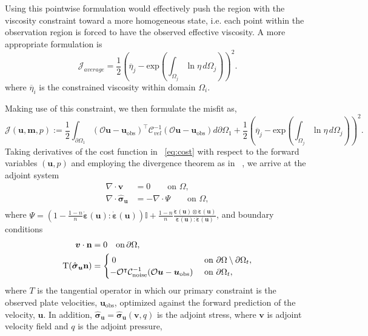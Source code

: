 \documentclass[12pt]{article}
\newcommand{\mm}{{\ensuremath{\boldsymbol{m}}}}
\newcommand{\uu}{{\ensuremath{\boldsymbol{u}}}}
\newcommand{\vv}{{\ensuremath{\boldsymbol{v}}}}
\newcommand{\ssigma}{{\ensuremath{\boldsymbol{\sigma}}}}
\newcommand{\strain}{{\ensuremath{\dot{\boldsymbol{\varepsilon}}}}}
\begin{document}
{Using this pointwise formulation would effectively push the region with the viscosity constraint toward a more homogeneous state, i.e. each point within the observation region is forced to have the observed effective viscosity. A more appropriate formulation is
\begin{equation}
 \mathcal{J}_{average}=\frac{1}{2}(\overline{\eta}_j - \text{exp}({\int_{\Omega_j} \ln \eta \,d\Omega_j}))^{2}.
\end{equation}
where $\overline{\eta}_i$ is the constrained viscosity within domain $\Omega_i$.

Making use of this constraint, we then formulate the misfit as,
\begin{equation}
  \mathcal{J}(\uu,\mm,p):= \frac{1}{2}\int_{\partial \Omega_1} (\mathcal{O}\uu-\uu_{\text{obs}})^\intercal\mathcal{C}^{-1}_{vel}(\mathcal{O}\uu-\uu_{\text{obs}})d\partial\Omega_1 
   +\frac{1}{2}(\overline{\eta}_j - \text{exp}({\int_{\Omega_j} \ln \eta \, d\Omega_j}))^{2}.
\label{eq:cost}
\end{equation}
Taking derivatives of the cost function in ~\eqref{eq:cost} with respect to the forward variables $(\uu,p)$ and employing the divergence theorem as in ~\citep{ratnaswamy2015adjoint}, we arrive at
the adjoint system
\begin{equation}
  \label{eq:adjoint}
  \begin{split}
    \nabla \cdot \vv &=0 \qquad  \text{on } \Omega, \\
    \nabla \cdot \hat \ssigma_\uu&=-\nabla \cdot \Psi   \qquad \text{on } \Omega, \\
  \end{split}
\end{equation}
where $\Psi = (1-\frac{1-n}{n}\strain(\uu):\strain(\uu))\mathbb{I} + \frac{1-n}{n} \frac{\strain(\uu)\otimes \strain(\uu)}{\strain(\uu):\strain(\uu)}$, and boundary conditions
\begin{align*}
  \vv\cdot \textbf{n}&=0 \quad \text{on} \, \partial \Omega, \\
  \boldmath{\mathrm{T}}(\hat\ssigma_\uu \textbf{n})
  &=\begin{cases} \:0 & \text{ on }\partial \Omega\setminus
  \partial\Omega_t, \\
  -\mathcal{O}^\intercal\mathcal{C}^{-1}_{\text{noise}}(\mathcal O \uu-\uu_{\text{obs}}) &\text{ on }
  \partial\Omega_t,
  \end{cases}
  \label{eq:adjoint}
\end{align*}
where $T$ is the tangential operator in which our primary constraint is the observed plate velocities, $\uu_{\text{obs}}$, optimized against the forward prediction of the velocity, $\uu$. In addition, $\hat\ssigma_\uu = \hat\ssigma_\uu(\vv,q)$ is the adjoint stress, where $\vv$ is adjoint velocity field and $q$ is the adjoint pressure,
}
\end{document}

